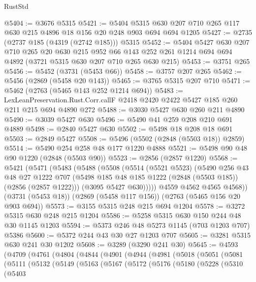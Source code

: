 \begin{lexlean}{RustStd}
\begin{coremodule}
@5404 := @3676 @5315
@5421 := @5404 @5315 @630 @207 @710 @265 @117 @630 @215 @4896 @18 @156 @20 @248 @903 @694 @694 @1205
@5427 := @2735 (@2737 @185 (@4319 (@2742 @185))) @5315
@5452 := @5404
    @5427
    @630
    @207
    @710
    @265
    @20
    @630
    @215
    @952
    @66
    @143
    @252
    @261
    @1214
    @694
    @694
    @4892
    (@3721 @5315 @630 @207 @710 @265 @630 @215)
@5453 := @3751 @265
@5456 := @5452 (@3731 (@5453 @66))
@5458 := @3757 @207 @265
@5462 := @5456 (@2869 (@5458 @20 @143))
@5465 := @3765 @5315 @207 @710
@5471 := @5462 (@2763 (@5465 @143 @252 @1214 @694))
@5483 := LexLeanPreservation.Rust.Corr.callF
    @2418
    @2420
    @2422
    @5427
    @185
    @260
    @211
    @215
    @694
    @4890
    @272
@5488 := @3030 @5427 @630 @260 @211 @4890
@5490 := @3039 @5427 @630
@5496 := @5490 @41 @259 @208 @210 @691 @4889
@5498 := @2840 @5427 @630
@5502 := @5498 @18 @208 @18 @691
@5503 := @2849 @5427
@5508 := @5496 (@5502 (@2848 (@5503 @18)) @2859)
@5514 := @5490 @254 @258 @48 @177 @1220 @4888
@5521 := @5498 @90 @48 @90 @1220 (@2848 (@5503 @90))
@5523 := @2856 (@2857 @1220)
@5568 := @5421
    (@5471
      (@5483
        (@5488
          (@5508
            (@5514
              (@5521 @5523)
              (@5490
                @256
                @43
                @48
                @27
                @1222
                @707
                (@5498 @185 @48 @185 @1222 (@2848 (@5503 @185)) (@2856 (@2857 @1222)))
                (@3095 @5427 @630)))))
        @4559
        @4562
        @4565
        @4568))
    (@3731 (@5453 @18))
    (@2869 (@5458 @117 @156))
    (@2763 (@5465 @156 @20 @903 @694))
@5573 := @3155 @5315 @248 @215 @694 @1204
@5578 := @3272 @5315 @630 @248 @215 @1204
@5586 := @5258 @5315 @630 @150 @244 @48 @30 @1145 @1203
@5594 := @5373 @246 @48 @5273 @1145 (@703 @1203 @707) @5386
@5600 := @5372 @244 @43 @30 @27 @1203 @707
@5605 := @3281 @5315 @630 @241 @30 @1202
@5608 := @3289 (@3290 @241 @30)
@5645 := @4593
    (@4709
      (@4761
        (@4804
          (@4844
            (@4901
              (@4944
                (@4981
                  (@5018
                    (@5051
                      (@5081
                        (@5111
                          (@5132
                            (@5149
                              (@5163
                                (@5167
                                  (@5172
                                    (@5176
                                      (@5180
                                        (@5228
                                          (@5310
                                            (@5403

\end{coremodule}
\end{lexlean}
